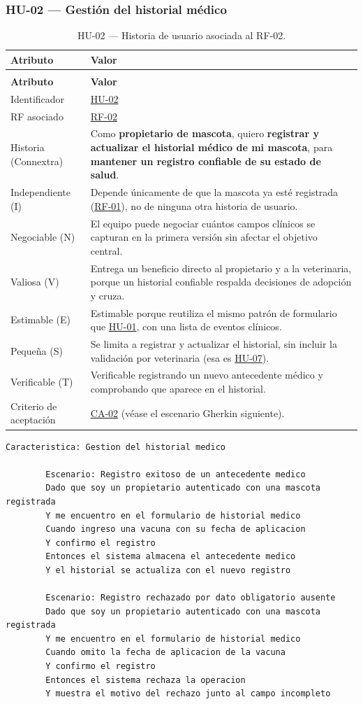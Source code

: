 \documentclass[journal,onecolumn]{IEEEtran}
\makeatletter
\newenvironment{atributos}[2]{%
	\small
	\begin{longtable}{@{}>{\raggedright\arraybackslash}p{4.2cm} >{\raggedright\arraybackslash}p{11.2cm}@{}}
		\caption{#2}\label{tab:#1}\\
		\toprule
		\textbf{Atributo} & \textbf{Valor} \\
		\midrule
		\endfirsthead
		\multicolumn{2}{@{}l}{\small\itshape (continuación)}\\
		\toprule
		\textbf{Atributo} & \textbf{Valor} \\
		\midrule
		\endhead
		\bottomrule
		\endlastfoot
	}{%
	\end{longtable}
	\normalsize
}
\makeatother
\begin{document}
	\subsubsection{HU-02 --- Gestión del historial médico}
	
	\begin{atributos}{HU-02}{HU-02 --- Historia de usuario asociada al RF-02.}
		Identificador & \hyperref[tab:HU-02]{HU-02} \\
		RF asociado & \hyperref[tab:RF-02]{RF-02} \\
		Historia (Connextra) & Como \textbf{propietario de mascota}, quiero \textbf{registrar y actualizar el historial médico de mi mascota}, para \textbf{mantener un registro confiable de su estado de salud}. \\
		Independiente (I) & Depende únicamente de que la mascota ya esté registrada (\hyperref[tab:RF-01]{RF-01}), no de ninguna otra historia de usuario. \\
		Negociable (N) & El equipo puede negociar cuántos campos clínicos se capturan en la primera versión sin afectar el objetivo central. \\
		Valiosa (V) & Entrega un beneficio directo al propietario y a la veterinaria, porque un historial confiable respalda decisiones de adopción y cruza. \\
		Estimable (E) & Estimable porque reutiliza el mismo patrón de formulario que \hyperref[tab:HU-01]{HU-01}, con una lista de eventos clínicos. \\
		Pequeña (S) & Se limita a registrar y actualizar el historial, sin incluir la validación por veterinaria (esa es \hyperref[tab:HU-07]{HU-07}). \\
		Verificable (T) & Verificable registrando un nuevo antecedente médico y comprobando que aparece en el historial. \\
		Criterio de aceptación & \hyperref[lst:ca02]{CA-02} (véase el escenario Gherkin siguiente). \\
	\end{atributos}
	
	\begin{lstlisting}[style=gherkin,caption={CA-02 --- Escenario de aceptación de la historia HU-02.},label={lst:ca02}]
		Caracteristica: Gestion del historial medico
		
		Escenario: Registro exitoso de un antecedente medico
		Dado que soy un propietario autenticado con una mascota registrada
		Y me encuentro en el formulario de historial medico
		Cuando ingreso una vacuna con su fecha de aplicacion
		Y confirmo el registro
		Entonces el sistema almacena el antecedente medico
		Y el historial se actualiza con el nuevo registro
		
		Escenario: Registro rechazado por dato obligatorio ausente
		Dado que soy un propietario autenticado con una mascota registrada
		Y me encuentro en el formulario de historial medico
		Cuando omito la fecha de aplicacion de la vacuna
		Y confirmo el registro
		Entonces el sistema rechaza la operacion
		Y muestra el motivo del rechazo junto al campo incompleto
	\end{lstlisting}
	
\end{document}
